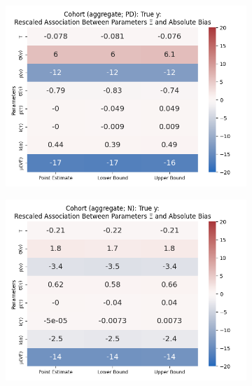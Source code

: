 \documentclass[12pt]{article}
\begin{document}
\begin{figure}[H]
	\begin{subfigure}[t]{0.23\linewidth}
		\centering
		\caption{}
		\includegraphics[scale=0.25]{VEMethod_Drivers1b_FEest_Realistic2_Li_MSpec_Heatmap3.png}
	\end{subfigure}
	\begin{subfigure}[t]{0.23\linewidth}
		\centering
		\caption{}
		\includegraphics[scale=0.25]{VEMethod_Drivers1b_FEest_Realistic2_Li_MSpec_Heatmap4.png}
	\end{subfigure}
	

\end{figure}
\end{document}
